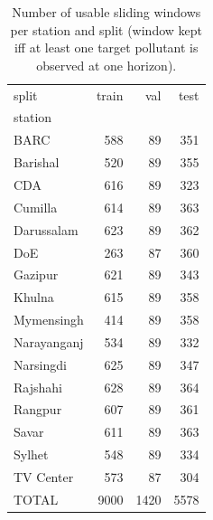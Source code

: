 \begin{table}
\caption{Number of usable sliding windows per station and split (window kept iff at least one target pollutant is observed at one horizon).}
\label{tab:window_counts}
\begin{tabular}{lrrr}
\toprule
split & train & val & test \\
station &  &  &  \\
\midrule
BARC & 588 & 89 & 351 \\
Barishal & 520 & 89 & 355 \\
CDA & 616 & 89 & 323 \\
Cumilla & 614 & 89 & 363 \\
Darussalam & 623 & 89 & 362 \\
DoE & 263 & 87 & 360 \\
Gazipur & 621 & 89 & 343 \\
Khulna & 615 & 89 & 358 \\
Mymensingh & 414 & 89 & 358 \\
Narayanganj & 534 & 89 & 332 \\
Narsingdi & 625 & 89 & 347 \\
Rajshahi & 628 & 89 & 364 \\
Rangpur & 607 & 89 & 361 \\
Savar & 611 & 89 & 363 \\
Sylhet & 548 & 89 & 334 \\
TV Center & 573 & 87 & 304 \\
TOTAL & 9000 & 1420 & 5578 \\
\bottomrule
\end{tabular}
\end{table}

